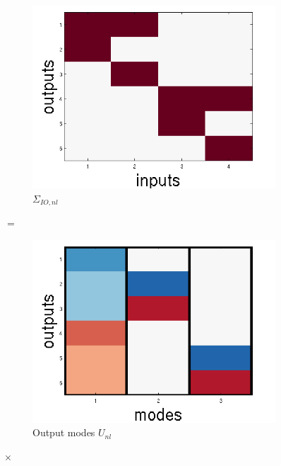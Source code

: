 \documentclass[10pt,letterpaper]{article}
\begin{document}
\begin{figure}
\centering
\begin{subfigure}{0.22\textwidth}
\includegraphics[width=\textwidth]{figures/nonlinear_IO.png}
\caption{$\Sigma_{IO,nl}$}
\end{subfigure}
\huge{$=$}
\begin{subfigure}{0.22\textwidth}
\includegraphics[width=\textwidth]{figures/U_nl.png}
\caption{Output modes $U_{nl}$}
\end{subfigure}
\LARGE{$\times$}
\begin{subfigure}{0.22\textwidth}

\end{subfigure}
\end{figure}
\end{document}
